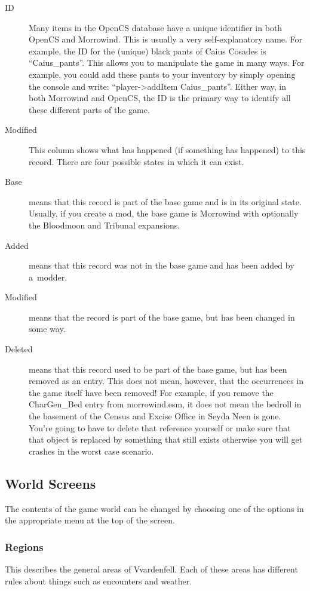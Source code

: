 \begin{description}
\item[ID] Many items in the OpenCS database have a unique identifier in both OpenCS and Morrowind. This is usually a very self-explanatory name. For example, the ID for the (unique) black pants of Caius Cosades is ``Caius\_pants''. This allows you to manipulate the game in many ways. For example, you could add these pants to your inventory by simply opening the console and write: ``player->addItem Caius\_pants''. Either way, in both Morrowind and OpenCS, the ID is the primary way to identify all these different parts of the game.
\item[Modified] This column shows what has happened (if something has happened) to this record. There are four possible states in which it can exist. 
\item[Base] means that this record is part of the base game and is in its original state. Usually, if you create a mod, the base game is Morrowind with optionally the Bloodmoon and Tribunal expansions.
\item[Added] means that this record was not in the base game and has been added by a~modder.
\item[Modified] means that the record is part of the base game, but has been changed in some way.
\item[Deleted] means that this record used to be part of the base game, but has been removed as an entry. This does not mean, however, that the occurrences
in the game itself have been removed! For example, if you remove the CharGen\_Bed entry from morrowind.esm, it does not mean the bedroll in the basement
of the Census and Excise Office in Seyda Neen is gone. You're going to have to delete that reference yourself or make sure that that object is replaced
by something that still exists otherwise you will get crashes in the worst case scenario.
\end{description}

\subsection{World Screens}
The contents of the game world can be changed by choosing one of the options in the appropriate menu at the top of the screen.

\subsubsection{Regions}
This describes the general areas of Vvardenfell. Each of these areas has different rules about things such as encounters and weather.


